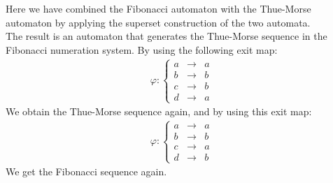 \documentclass{article}
\begin{document}
Here we have combined the Fibonacci automaton with the Thue-Morse automaton by
applying the superset construction of the two automata.\\
The result is an automaton that generates the Thue-Morse sequence in the
Fibonacci numeration system. By using the following exit map:
\begin{eqnarray*}
\varphi: \left\{ \begin{array}{lll}
a &\rightarrow& a\\
b &\rightarrow& b\\
c &\rightarrow& b\\
d &\rightarrow& a
\end{array} \right.
\end{eqnarray*}
We obtain the Thue-Morse sequence again, and by using this exit map:
\begin{eqnarray*}
\varphi: \left\{ \begin{array}{lll}
a &\rightarrow& a\\
b &\rightarrow& b\\
c &\rightarrow& a\\
d &\rightarrow& b
\end{array} \right.
\end{eqnarray*}
We get the Fibonacci sequence again.
\end{document}
